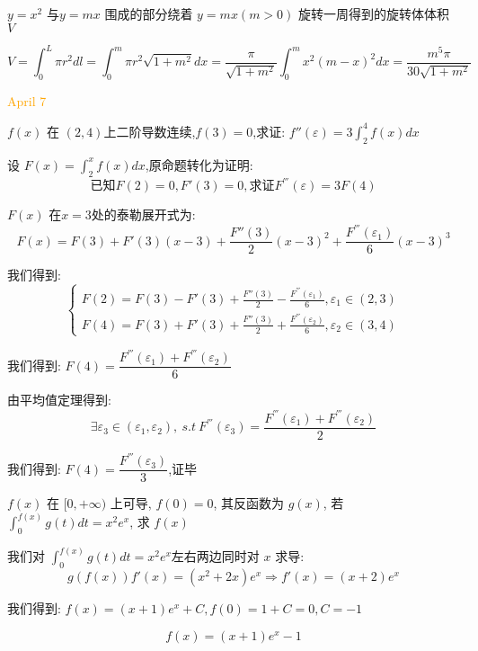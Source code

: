 \begin{example}[][Exam: 30.1.12]
	$y=x^2$ 与$y=mx$ 围成的部分绕着 $y=mx(m>0)$ 旋转一周得到的旋转体体积 $V$
\end{example}

\begin{solution}
	
	$$V=\int_{0}^{L}\pi r^2dl=\int_{0}^{m}\pi r^2\sqrt{1+m^2}dx=\frac{\pi}{\sqrt{1+m^2}}\int_{0}^{m}x^2(m-x)^2dx
	=\frac{m^5\pi}{30\sqrt{1+m^2}}$$
\end{solution}


\textcolor{orange}{April 7}

\begin{example}[][Exam: 30.1.13]
	 $f(x)$ 在 $(2,4)$上二阶导数连续,$f(3)=0$,求证: $f''(\varepsilon)=3\int_{2}^{4}f(x)dx$
\end{example}

\begin{solution}
	
	设 $ F(x)=\int_{2}^{x}f(x)dx$,原命题转化为证明: $$\text{已知}F(2)=0,F'(3)=0,\text{求证}F^{'''}(\varepsilon)=3F(4)$$
	
	$F(x)$ 在$x=3$处的泰勒展开式为: 
	$$F(x)=F(3)+F'(3)(x-3)+\frac{F''(3)}{2}(x-3)^2+\frac{F^{'''}(\varepsilon_{1})}{6}(x-3)^{3}$$
	
	我们得到: 
	$$\left\lbrace 
	\begin{array}{l}
		F(2)=F(3)-F'(3)+\frac{F''(3)}{2}-\frac{F^{'''}(\varepsilon_{1})}{6},\varepsilon_{1}\in (2,3)\\
		F(4)=F(3)+F'(3)+\frac{F''(3)}{2}+\frac{F^{'''}(\varepsilon_{2})}{6},\varepsilon_{2}\in (3,4)
	\end{array}\right. $$

	我们得到: $F(4)=\dfrac{F^{'''}(\varepsilon_{1})+F^{'''}(\varepsilon_{2})}{6}$
	
	由平均值定理得到: $$\exists \varepsilon_{3}\in(\varepsilon_{1},\varepsilon_{2}),\ s.t\ F^{'''}(\varepsilon_{3})=\frac{F^{'''}(\varepsilon_{1})+F^{'''}(\varepsilon_{2})}{2}$$
	
	我们得到: $F(4)=\dfrac{F^{'''}(\varepsilon_{3})}{3}$,证毕
	
\end{solution}

\begin{example}[][Exam: 30.1.14]
	$f(x)$ 在 $[0,+\infty)$ 上可导, $f(0)=0$, 其反函数为 $g(x)$, 若 $\int_{0}^{f(x)}g(t)dt=x^2e^x$, 求 $f(x)$
\end{example}

\begin{solution}
	
	我们对 $\int_{0}^{f(x)}g(t)dt=x^2e^x$左右两边同时对 $x$ 求导: 
	$$g(f(x))f'(x)=(x^2+2x)e^x\Rightarrow f'(x)=(x+2)e^{x}$$
	
	我们得到: $f(x)=(x+1)e^x+C,f(0)=1+C=0,C=-1$
	
	$$f(x)=(x+1)e^{x}-1$$
\end{solution}

